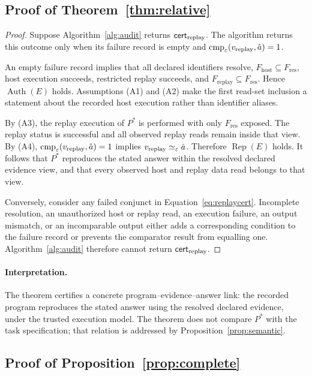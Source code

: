 \subsection{Proof of Theorem~\ref{thm:relative}}

\begin{proof}
Suppose Algorithm~\ref{alg:audit} returns
$\mathsf{cert}_{\mathrm{replay}}$. The algorithm returns this outcome only
when its failure record is empty and
$\operatorname{cmp}_{\varepsilon}
(v_{\mathrm{replay}},\hat a)=1$.

An empty failure record implies that all declared identifiers
resolve, $F_{\mathrm{host}}\subseteq F_{\mathrm{res}}$, host
execution succeeds, restricted replay succeeds, and
$F_{\mathrm{replay}}\subseteq F_{\mathrm{res}}$. Hence
$\operatorname{Auth}(E)$ holds. Assumptions (A1) and (A2) make the
first read-set inclusion a statement about the recorded host
execution rather than identifier aliases.

By (A3), the replay execution of $P^*$ is performed with only
$F_{\mathrm{res}}$ exposed. The replay status is successful and
all observed replay reads remain inside that view. By (A4),
$\operatorname{cmp}_{\varepsilon}
(v_{\mathrm{replay}},\hat a)=1$ implies
$v_{\mathrm{replay}}\simeq_{\varepsilon}\hat a$. Therefore
$\operatorname{Rep}(E)$ holds. It follows that $P^*$ reproduces
the stated answer within the resolved declared evidence view, and
that every observed host and replay data read belongs to that
view.

Conversely, consider any failed conjunct in
Equation~\ref{eq:replaycert}. Incomplete resolution, an
unauthorized host or replay read, an execution failure, an output
mismatch, or an incomparable output either adds a corresponding
condition to the failure record or prevents the comparator result
from equalling one. Algorithm~\ref{alg:audit} therefore cannot
return $\mathsf{cert}_{\mathrm{replay}}$.
\end{proof}

\paragraph{Interpretation.}
The theorem certifies a concrete program--evidence--answer link:
the recorded program reproduces the stated answer using the
resolved declared evidence, under the trusted execution model.
The theorem does not compare $P^*$ with the task specification;
that relation is addressed by
Proposition~\ref{prop:semantic}.

\subsection{Proof of Proposition~\ref{prop:complete}}

